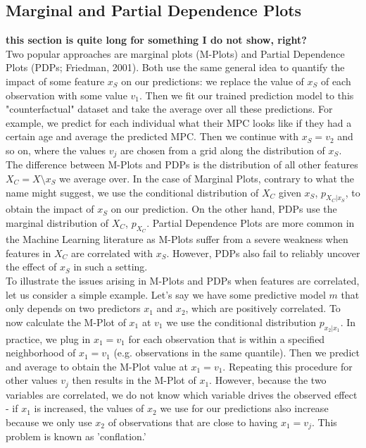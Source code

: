 \subsection{Marginal and Partial Dependence Plots}
\textbf{this section is quite long for something I do not show, right?} \\
Two popular approaches are marginal plots (M-Plots) and Partial Dependence Plots (PDPs; Friedman, 2001). Both use the same general idea to quantify the impact of some feature $x_S$ on our predictions: we replace the value of $x_S$ of each observation with some value $v_1$. Then we fit our trained prediction model to this "counterfactual" dataset and take the average over all these predictions. For example, we predict for each individual what their MPC looks like if they had a certain age and average the predicted MPC. Then we continue with $x_S=v_2$ and so on, where the values $v_j$ are chosen from a grid along the distribution of $x_S$. The difference between M-Plots and PDPs is the distribution of all other features $X_C=X\setminus x_S$ we average over. In the case of Marginal Plots, contrary to what the name might suggest, we use the conditional distribution of $X_C$ given $x_S$, $p_{X_C|x_S}$, to obtain the impact of $x_S$ on our prediction. On the other hand, PDPs use the marginal distribution of $X_C$, $p_{X_C}$. 
Partial Dependence Plots are more common in the Machine Learning literature as M-Plots suffer from a severe weakness when features in $X_C$ are correlated with $x_S$. However, PDPs also fail to reliably uncover the effect of $x_S$ in such a setting. \\
To illustrate the issues arising in M-Plots and PDPs when features are correlated, let us consider a simple example. Let's say we have some predictive model $m$ that only depends on two predictors $x_1$ and $x_2$, which are positively correlated. To now calculate the M-Plot of $x_1$ at $v_1$ we use the conditional distribution $p_{x_2|x_1}$. In practice, we plug in $x_1=v_1$ for each observation that is within a specified neighborhood of $x_1=v_1$ (e.g. observations in the same quantile). Then we predict and average to obtain the M-Plot value at $x_1=v_1$. Repeating this procedure for other values $v_j$ then results in the M-Plot of $x_1$. However, because the two variables are correlated, we do not know which variable drives the observed effect - if $x_1$  is increased, the values of $x_2$  we use for our predictions also increase because we only use $x_2$ of observations that are close to having $x_1=v_j$. This problem is known as 'conflation.' \\
